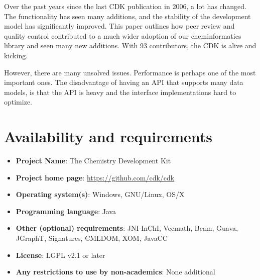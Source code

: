 \documentclass[10pt]{bmcart}
\begin{document}
Over the past years since the last CDK publication in 2006, a lot has changed. The functionality
has seen many additions, and the stability of the development model has significantly improved.
This paper outlines how peer review and quality control contributed to a much wider adoption
of our cheminformatics library and seen many new additions. With 93 contributors,
the CDK is alive and kicking.

However, there are many unsolved issues. Performance is perhaps one of the most important ones.
The disadvantage of having an API that supports many data models, is that the API is heavy and
the interface implementations hard to optimize.

\section*{Availability and requirements}

\begin{itemize}
\item \textbf{Project Name}: The Chemistry Development Kit
\item \textbf{Project home page}: \url{https://github.com/cdk/cdk}
\item \textbf{Operating system(s)}: Windows, GNU/Linux, OS/X
\item \textbf{Programming language}: Java
\item \textbf{Other (optional) requirements}: JNI-InChI, Vecmath, Beam, Guava, JGraphT, Signatures, CMLDOM, XOM, JavaCC
\item \textbf{License}: LGPL v2.1 or later
\item \textbf{Any restrictions to use by non-academics}: None additional
\end{itemize}

\end{document}
